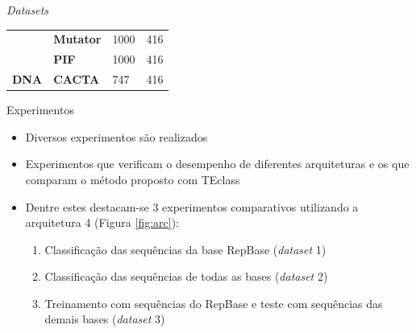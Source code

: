 \documentclass[%
  xcolor=table,%
  10pt,%
  aspectratio = 169,%
  compress,%
  t,%
]{beamer}%
\begin{document}
\begin{frame}{}{\textit{Datasets}}
\begin{table}[H]
\begin{tabular}{|c|l|l|l|}
            \rowcolor[HTML]{FFFFFF} 
            \cellcolor[HTML]{EFEFEF}                                     & \textbf{Mutator}                    & 1000                        & 416                        \\ \cline{2-4} 
            \rowcolor[HTML]{EFEFEF} 
            \cellcolor[HTML]{EFEFEF}                                     & {\color[HTML]{000000} \textbf{PIF}} & {\color[HTML]{000000} 1000} & {\color[HTML]{000000} 416} \\ \cline{2-4} 
            \multirow{-5}{*}{\cellcolor[HTML]{EFEFEF}\textbf{DNA}}       & \textbf{CACTA}                      & 747                         & 416                        \\ \hline
        \end{tabular}
    \end{table}
\end{frame}


\begin{frame}{}{Experimentos}
    \begin{itemize}
        \item Diversos experimentos são realizados
        \item Experimentos que verificam o desempenho de diferentes arquiteturas e os que comparam o método proposto com TEclass
        \item Dentre estes destacam-se 3 experimentos comparativos utilizando a arquitetura 4 (Figura \ref{fig:arc}):
        \begin{enumerate}
            \item Classificação das sequências da base RepBase (\textit{dataset} 1)
            \item Classificação das sequências de todas as bases (\textit{dataset} 2)
            \item Treinamento com sequências do RepBase e teste com sequências das demais bases (\textit{dataset} 3)
        \end{enumerate}
    \end{itemize}
\end{frame}
\end{document}
